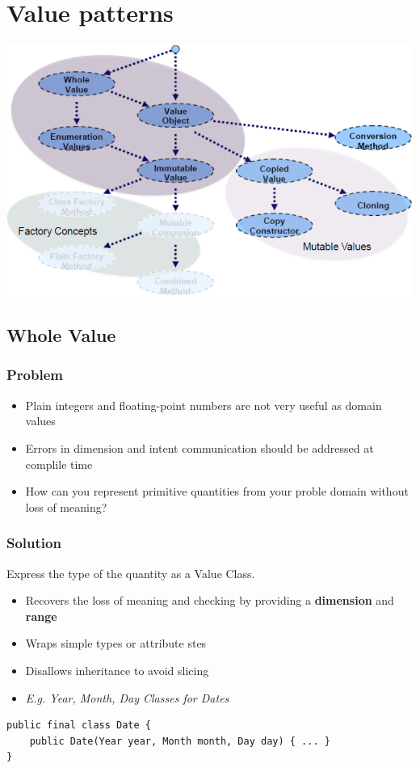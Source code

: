 \section{Value patterns}
\includegraphics[width=\linewidth]{./img/value_pattern_overview.png}

\subsection{Whole Value}
\subsubsection{Problem}
\begin{itemize}
    \item Plain integers and floating-point numbers are not very useful as domain values
    \item Errors in dimension and intent communication should be addressed at complile time
    \item How can you represent primitive quantities from your proble domain without loss of meaning?
\end{itemize}
\subsubsection{Solution}
Express the type of the quantity as a Value Class.\\ 
\begin{itemize}
    \item Recovers the loss of meaning and checking by providing a \textbf{dimension} and \textbf{range}
    \item Wraps simple types or attribute stes
    \item Disallows inheritance to avoid slicing
    \item \textit{E.g. Year, Month, Day Classes for Dates}
\end{itemize}
\begin{lstlisting}
public final class Date {
    public Date(Year year, Month month, Day day) { ... }
}
\end{lstlisting}

